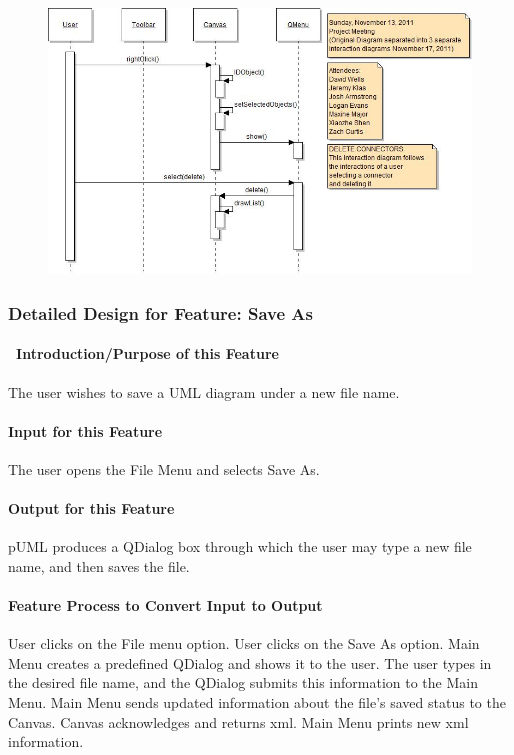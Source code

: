 \documentclass[twoside,letterpaper]{article}
\begin{document}
{\begin{figure}[h]
\centering
\includegraphics[width=6.0in]{IntDelConn.jpg}
\end{figure}

\clearpage

  


\subsubsection{Detailed Design for Feature: Save As }

\paragraph[\ Introduction/Purpose of this Feature]
{\ Introduction/Purpose of this Feature}
{\color{black}
The user wishes to save a UML diagram under a new file name.
}

\paragraph[Input for this Feature]{Input for this Feature}
{\color{black}
The user opens the File Menu and selects Save As.
}

\paragraph{Output for this Feature}
{\color{black}
pUML produces a QDialog box through which the user may type a new file name, and then saves the file.
}

\paragraph{Feature Process to Convert Input to Output}
{\color{black}
User clicks on the File menu option. User clicks on the Save As option. Main Menu creates a predefined QDialog and shows it to the user. The user types in the desired file name, and the QDialog submits this information to the Main Menu. Main Menu sends updated information about the file{\textquoteright}s saved status to the Canvas. Canvas acknowledges and returns xml.  Main Menu prints new xml information.
}

}
\end{document}
